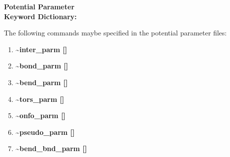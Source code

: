 \clearpage
\begin{center}
\huge
{\bf Potential Parameter \\ Keyword Dictionary: } 
\end{center}
\large

The following commands maybe specified in the potential parameter files:
\begin{enumerate}
\LARGE
\item {\bf \~{ }inter\_parm []}
\item {\bf \~{ }bond\_parm []}
\item {\bf \~{ }bend\_parm []}
\item {\bf \~{ }tors\_parm []}
\item {\bf \~{ }onfo\_parm []}
\item {\bf \~{ }pseudo\_parm []}
\item {\bf \~{ }bend\_bnd\_parm []}
\end{enumerate}



